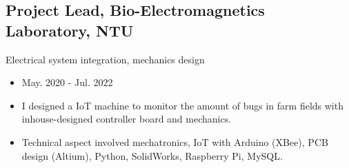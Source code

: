 \documentclass[12pt]{article}
\begin{document}
        \subsection*{Project Lead, Bio-Electromagnetics Laboratory, NTU}
        {\sffamily
        Electrical system integration, mechanics design
        \begin{itemize}
            \item May. 2020 - Jul. 2022
            \item I designed a IoT machine to monitor the amount of bugs in farm fields with inhouse-designed controller board and mechanics.
            \item Technical aspect involved mechatronics, IoT with Arduino (XBee), PCB design (Altium), Python, SolidWorks, Raspberry Pi, MySQL.
        \end{itemize}
        }
        
\end{document}
